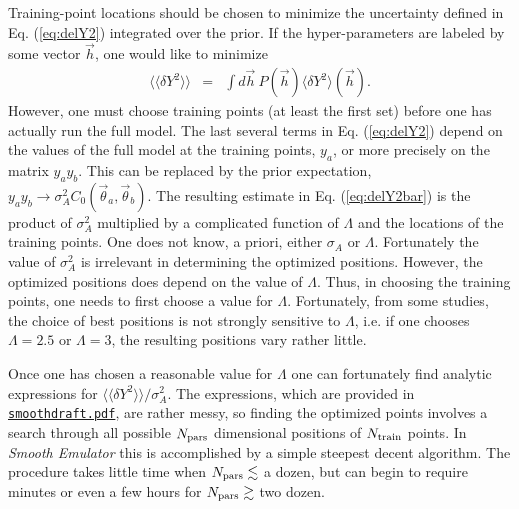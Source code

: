 \documentclass[UserManual.tex]{subfiles}
\begin{document}
Training-point locations should be chosen to minimize the uncertainty defined in Eq. (\ref{eq:delY2}) integrated over the prior. If the hyper-parameters are labeled by some vector $\vec{h}$, one would like to minimize
\begin{eqnarray}\label{eq:delY2bar}
\langle\langle \delta Y^2\rangle\rangle&=&
\int d\vec{h}~P(\vec{h})\langle \delta Y^2\rangle(\vec{h}).
\end{eqnarray}
However, one must choose training points (at least the first set) before one has actually run the full model. The last several terms in Eq. (\ref{eq:delY2}) depend on the values of the full model at the training points, $y_a$, or more precisely on the matrix $y_ay_b$. This can be replaced by the prior expectation, $y_ay_b\rightarrow \sigma_A^2C_0(\vec{\theta}_a,\vec{\theta}_b)$. The resulting estimate in Eq. (\ref{eq:delY2bar}) is the product of $\sigma_A^2$ multiplied by a complicated function of $\Lambda$ and the locations of the training points. One does not know, a priori, either $\sigma_A$ or $\Lambda$. Fortunately the value of $\sigma_A^2$ is irrelevant in determining the optimized positions. However, the optimized positions does depend on the value of $\Lambda$. Thus, in choosing the training points, one needs to first choose a value for $\Lambda$. Fortunately, from some studies, the choice of best positions is not strongly sensitive to $\Lambda$, i.e. if one chooses $\Lambda=2.5$ or $\Lambda=3$, the resulting positions vary rather little. 

Once one has chosen a reasonable value for $\Lambda$ one can fortunately find analytic expressions for $\langle\langle \delta Y^2\rangle\rangle/\sigma_A^2$. The expressions, which are provided in \href{./smoothdraft.pdf}{{\tt smoothdraft.pdf}}, are rather messy, so finding the optimized points involves a search through all possible $N_{\rm pars}$ dimensional positions of $N_{\rm train}$ points. In {\it Smooth Emulator} this is accomplished by a simple steepest decent algorithm. The procedure takes little time when $N_{\rm pars}\lesssim$ a dozen, but can begin to require minutes or even a few hours for $N_{\rm pars}\gtrsim$ two dozen. 
\end{document}
